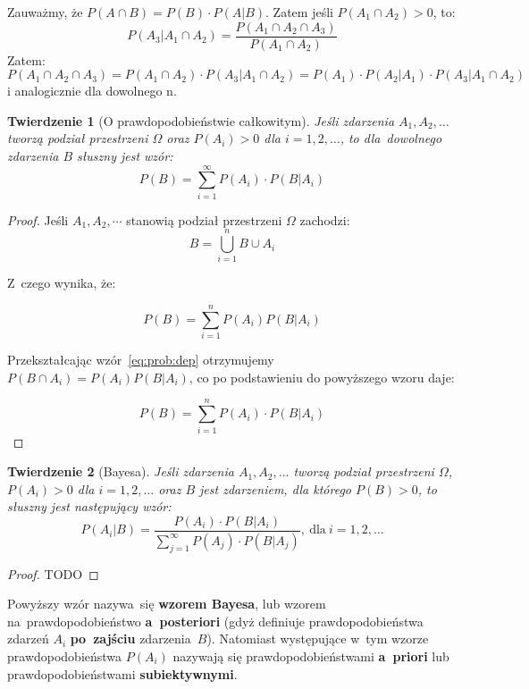\documentclass[10pt,a4paper]{article}
\newtheorem{theorem}{Twierdzenie}[section]
\numberwithin{equation}{subsection}
\begin{document}
Zauważmy, że $P(A\cap B)=P(B)\cdot P(A|B)$. Zatem jeśli $P(A_1\cap A_2)>0$, to:
\[
  P(A_3|A_1\cap A_2)=\frac{P(A_1\cap A_2 \cap A_3)}{P(A_1\cap A_2)}
\]
Zatem:
\[
  P(A_1\cap A_2 \cap A_3) = P(A_1\cap A_2)\cdot P(A_3|A_1\cap A_2) = P(A_1)
  \cdot P(A_2|A_1)\cdot P(A_3|A_1\cap A_2)
\]
i analogicznie dla dowolnego n.

\begin{theorem}[O prawdopodobieństwie całkowitym]
  Jeśli zdarzenia $A_1,A_2,\dotsc$ tworzą podział przestrzeni $\Omega$ oraz
  $P(A_i)>0$ dla $i=1,2,\dotsc$, to dla~dowolnego zdarzenia $B$ słuszny jest
  wzór:
  \begin{equation}
    \label{eq:prob:sum}
    P(B) = \sum_{i=1}^{\infty} P(A_i)\cdot P(B|A_i)
  \end{equation}
\end{theorem}
\begin{proof}
  Jeśli $A_1,A_2,\cdots$ stanowią podział przestrzeni $\Omega$ zachodzi:
  \[
    B = \bigcup_{i=1}^n B \cup A_i
  \]

  Z~czego wynika, że:

  \[
    P(B) = \sum_{i=1}^n P(A_i)P(B|A_i)
  \]

  Przekształcając wzór~\ref{eq:prob:dep} otrzymujemy $P(B \cap A_i) = P(A_i)
  P(B|A_i)$, co po podstawieniu do powyższego wzoru daje:

  \begin{equation}
    P(B) = \sum_{i=1}^{n} P(A_i)\cdot P(B|A_i)
  \end{equation}
\end{proof}

\begin{theorem}[Bayesa]
  Jeśli zdarzenia $A_1,A_2,\dotsc$ tworzą podział przestrzeni $\Omega$,
  $P(A_i)>0$ dla $i=1,2,\dotsc$ oraz $B$ jest zdarzeniem, dla którego $P(B)>0$,
  to słuszny jest następujący wzór:
  \begin{equation}
    P(A_i|B) = \frac{P(A_i)\cdot P(B|A_i)}{\sum_{j=1}^{\infty}P(A_j)\cdot
      P(B|A_j)},\:\textrm{dla}\:i=1,2,\dotsc
  \end{equation}
\end{theorem}
\begin{proof}
  TODO
\end{proof}

Powyższy wzór nazywa~się \textbf{wzorem Bayesa}, lub wzorem na~prawdopodobieństwo
\textbf{a~posteriori} (gdyż definiuje prawdopodobieństwa zdarzeń $A_i$
\textbf{po~zajściu} zdarzenia~$B$). Natomiast występujące w~tym wzorze
prawdopodobieństwa $P(A_i)$ nazywają się prawdopodobieństwami \textbf{a~priori}
lub prawdopodobieństwami \textbf{subiektywnymi}.
\end{document}
